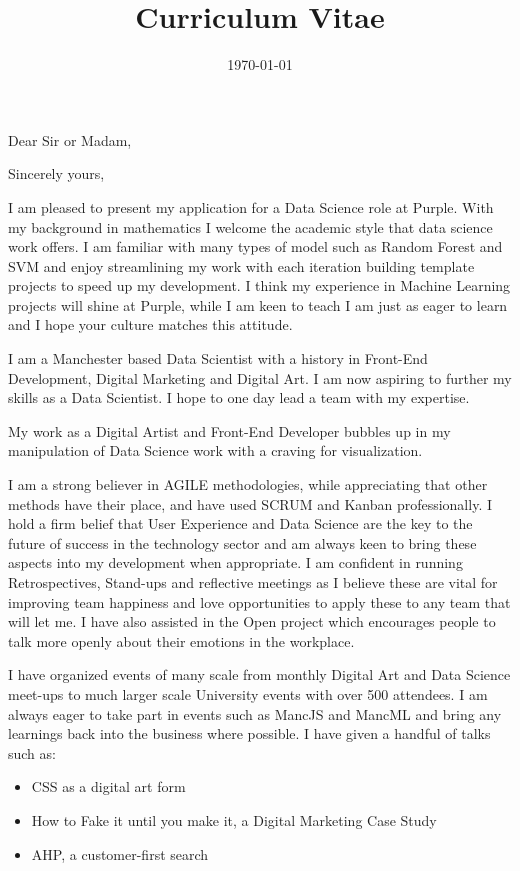 \documentclass[11pt,a4paper,sans]{moderncv} %
\title{Curriculum Vitae}
\begin{document}


\clearpage

\date{\today} %
\opening{Dear Sir or Madam,} %
\closing{Sincerely yours,} %

\makelettertitle %

I am pleased to present my application for a Data Science role at Purple. With my background in mathematics I welcome the academic style that data science work offers. I am familiar with many types of model such as Random Forest and SVM and enjoy streamlining my work with each iteration building template projects to speed up my development. I think my experience in Machine Learning projects will shine at Purple, while I am keen to teach I am just as eager to learn and I hope your culture matches this attitude.

I am a Manchester based Data Scientist with a history in Front-End Development, Digital Marketing and Digital Art. I am now aspiring to further my skills as a Data Scientist. I hope to one day lead a team with my expertise.

My work as a Digital Artist and Front-End Developer bubbles up in my manipulation of Data Science work with a craving for visualization.

I am a strong believer in AGILE methodologies, while appreciating that other methods have their place, and have used SCRUM and Kanban professionally. I hold a firm belief that User Experience and Data Science are the key to the future of success in the technology sector and am always keen to bring these aspects into my development when appropriate. I am confident in running Retrospectives, Stand-ups and reflective meetings as I believe these are vital for improving team happiness and love opportunities to apply these to any team that will let me. I have also assisted in the Open project which encourages people to talk more openly about their emotions in the workplace.

I have organized events of many scale from monthly Digital Art and Data Science meet-ups to much larger scale University events with over 500 attendees. I am always eager to take part in events such as MancJS and MancML and bring any learnings back into the business where possible. I have given a handful of talks such as:
\begin{itemize}
\item CSS as a digital art form
\item How to Fake it until you make it, a Digital Marketing Case Study
\item AHP, a customer-first search
\end{itemize}
\end{document}
